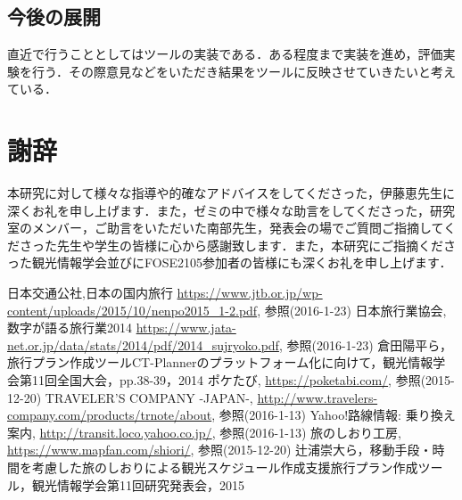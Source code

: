\documentclass{funthesis}
\begin{document}
\section{今後の展開}
直近で行うこととしてはツールの実装である．ある程度まで実装を進め，評価実験を行う．その際意見などをいただき結果をツールに反映させていきたいと考えている．



\chapter*{謝辞}
本研究に対して様々な指導や的確なアドバイスをしてくださった，伊藤恵先生に深くお礼を申し上げます．また，ゼミの中で様々な助言をしてくださった，研究室のメンバー，ご助言をいただいた南部先生，発表会の場でご質問ご指摘してくださった先生や学生の皆様に心から感謝致します．また，本研究にご指摘くださった観光情報学会並びにFOSE2105参加者の皆様にも深くお礼を申し上げます．



\begin{thebibliography}{9}
日本交通公社,日本の国内旅行  {\url{https://www.jtb.or.jp/wp-content/uploads/2015/10/nenpo2015_1-2.pdf}}, 参照(2016-1-23)
日本旅行業協会,数字が語る旅行業2014  {\url{https://www.jata-net.or.jp/data/stats/2014/pdf/2014_sujryoko.pdf}}, 参照(2016-1-23)
  倉田陽平ら，旅行プラン作成ツールCT-Plannerのプラットフォーム化に向けて，観光情報学会第11回全国大会，pp.38-39，2014
ポケたび,  {\url{https://poketabi.com/}}, 参照(2015-12-20)
TRAVELER'S COMPANY -JAPAN-,  {\url{http://www.travelers-company.com/products/trnote/about}}, 参照(2016-1-13)
Yahoo!路線情報: 乗り換え案内,  {\url{http://transit.loco.yahoo.co.jp/}}, 参照(2016-1-13)
旅のしおり工房,  {\url{https://www.mapfan.com/shiori/}}, 参照(2015-12-20)
 辻浦崇大ら，移動手段・時間を考慮した旅のしおりによる観光スケジュール作成支援旅行プラン作成ツール，観光情報学会第11回研究発表会，2015

\end{thebibliography}


\appendix
\end{document}

